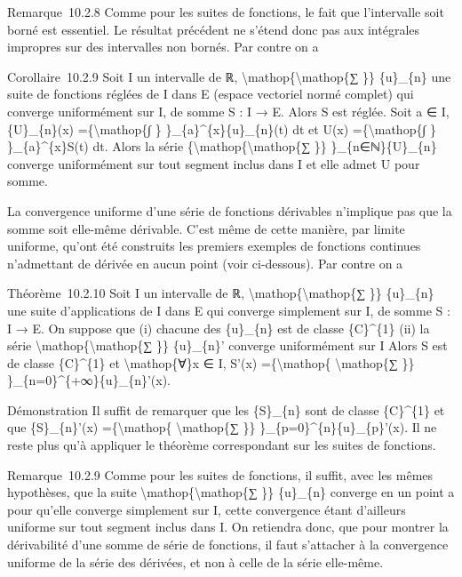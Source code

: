 \documentclass[]{article}
\begin{document}
Remarque~10.2.8 Comme pour les suites de fonctions, le fait que
l'intervalle soit borné est essentiel. Le résultat précédent ne s'étend
donc pas aux intégrales impropres sur des intervalles non bornés. Par
contre on a

Corollaire~10.2.9 Soit I un intervalle de ℝ,
\textbackslash{}mathop\{\textbackslash{}mathop\{∑ \}\} \{u\}\_\{n\} une
suite de fonctions réglées de I dans E (espace vectoriel normé complet)
qui converge uniformément sur I, de somme S : I → E. Alors S est réglée.
Soit a ∈ I, \{U\}\_\{n\}(x) =\{\textbackslash{}mathop\{∫ \}
\}\_\{a\}\^{}\{x\}\{u\}\_\{n\}(t) dt et U(x)
=\{\textbackslash{}mathop\{∫ \} \}\_\{a\}\^{}\{x\}S(t) dt. Alors la
série \{\textbackslash{}mathop\{\textbackslash{}mathop\{∑ \}\}
\}\_\{n∈ℕ\}\{U\}\_\{n\} converge uniformément sur tout segment inclus
dans I et elle admet U pour somme.

La convergence uniforme d'une série de fonctions dérivables n'implique
pas que la somme soit elle-même dérivable. C'est même de cette manière,
par limite uniforme, qu'ont été construits les premiers exemples de
fonctions continues n'admettant de dérivée en aucun point (voir
ci-dessous). Par contre on a

Théorème~10.2.10 Soit I un intervalle de ℝ,
\textbackslash{}mathop\{\textbackslash{}mathop\{∑ \}\} \{u\}\_\{n\} une
suite d'applications de I dans E qui converge simplement sur I, de somme
S : I → E. On suppose que (i) chacune des \{u\}\_\{n\} est de classe
\{C\}\^{}\{1\} (ii) la série
\textbackslash{}mathop\{\textbackslash{}mathop\{∑ \}\} \{u\}\_\{n\}'
converge uniformément sur I Alors S est de classe \{C\}\^{}\{1\} et
\textbackslash{}mathop\{∀\}x ∈ I, S'(x) =\{\textbackslash{}mathop\{
\textbackslash{}mathop\{∑ \}\} \}\_\{n=0\}\^{}\{+∞\}\{u\}\_\{n\}'(x).

Démonstration Il suffit de remarquer que les \{S\}\_\{n\} sont de classe
\{C\}\^{}\{1\} et que \{S\}\_\{n\}'(x) =\{\textbackslash{}mathop\{
\textbackslash{}mathop\{∑ \}\} \}\_\{p=0\}\^{}\{n\}\{u\}\_\{p\}'(x). Il
ne reste plus qu'à appliquer le théorème correspondant sur les suites de
fonctions.

Remarque~10.2.9 Comme pour les suites de fonctions, il suffit, avec les
mêmes hypothèses, que la suite
\textbackslash{}mathop\{\textbackslash{}mathop\{∑ \}\} \{u\}\_\{n\}
converge en un point a pour qu'elle converge simplement sur I, cette
convergence étant d'ailleurs uniforme sur tout segment inclus dans I. On
retiendra donc, que pour montrer la dérivabilité d'une somme de série de
fonctions, il faut s'attacher à la convergence uniforme de la série des
dérivées, et non à celle de la série elle-même.
\end{document}
